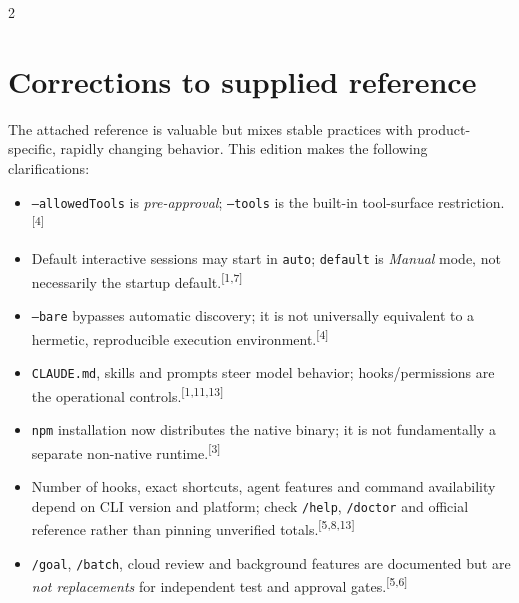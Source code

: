 \documentclass[9pt,a4paper]{extarticle}
\newcommand{\cmd}[1]{{\footnotesize\color{navy}\texttt{#1}}}
\newcommand{\src}[1]{\textsuperscript{\color{blue}[#1]}}
\begin{document}
\begin{multicols}{2}
\section{Corrections to supplied reference}
The attached reference is valuable but mixes stable practices with product-specific, rapidly changing behavior. This edition makes the following clarifications:
\begin{itemize}
\item \cmd{--allowedTools} is \emph{pre-approval}; \cmd{--tools} is the built-in tool-surface restriction.\src{4}
\item Default interactive sessions may start in \cmd{auto}; \cmd{default} is \emph{Manual} mode, not necessarily the startup default.\src{1,7}
\item \cmd{--bare} bypasses automatic discovery; it is not universally equivalent to a hermetic, reproducible execution environment.\src{4}
\item \cmd{CLAUDE.md}, skills and prompts steer model behavior; hooks/permissions are the operational controls.\src{1,11,13}
\item \cmd{npm} installation now distributes the native binary; it is not fundamentally a separate non-native runtime.\src{3}
\item Number of hooks, exact shortcuts, agent features and command availability depend on CLI version and platform; check \cmd{/help}, \cmd{/doctor} and official reference rather than pinning unverified totals.\src{5,8,13}
\item \cmd{/goal}, \cmd{/batch}, cloud review and background features are documented but are \emph{not replacements} for independent test and approval gates.\src{5,6}
\end{itemize}


\end{multicols}
\end{document}
